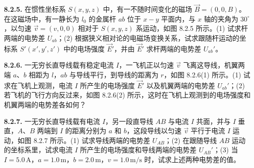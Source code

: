 \begin{center}
\end{center}

\vfill
\newpage

\textbf{8.2.5.} 在惯性坐标系 $S(x, y, z)$ 中，有一不随时间变化的磁场 $\vec{B} = (0, 0, B)$。在这磁场中，有一静长为 $l_0$ 的金属杆 $ab$ 位于 $x-y$ 平面内，与 $x$ 轴的夹角为 $30^\circ$，以匀速 $\vec{v} = (v, 0, 0)$ 相对于 $S(x, y, z)$ 系运动，如图 8.2.5 所示。(1) 试求杆两端的电势差 $U_{ab}$；(2) 根据狭义相对论的电磁场变换关系，试求跟随杆运动的坐标系 $S'(x', y', z')$ 中的电场强度 $\vec{E}'$，并由 $\vec{E}'$ 求杆两端的电势差 $U_{ab}'$。

\begin{center}
\end{center}

\vfill
\newpage

\textbf{8.2.6.} 一无穷长直导线载有稳定电流 $I$，一飞机正以匀速 $\vec{v}$ 飞离这导线，机翼两端 $a$、$b$ 相距为 $l$，$ab$ 与导线平行，到导线的距离为 $r$，如图 8.2.6(1) 所示。(1) 试求在飞机上观测，电流 $I$ 所产生的电场强度 $\vec{E}'$ 以及机翼两端的电势差 $U_{ab}'$；(2) 若飞机的飞行方向反过来，如图 8.2.6(2) 所示，这时在飞机上观测到的电场强度和机翼两端的电势差各如何？

\begin{center}
  \begin{minipage}[b]{0.47\linewidth}
    \centering
  \end{minipage}\hfill
  \begin{minipage}[b]{0.47\linewidth}
    \centering
  \end{minipage}
\end{center}

\vfill
\newpage

\textbf{8.2.7.} 一无穷长直导线载有电流 $I$，另一段直导线 $AB$ 与电流 $I$ 共面，并与 $I$ 垂直，$A$、$B$ 两端到 $I$ 的距离分别为 $a$ 和 $b$，这段导线以匀速 $\vec{v}$ 平行于电流 $I$ 运动，如图 8.2.7 所示。(1) 试求导线两端的电势差 $U_{AB}$；(2) 在跟随导线 $AB$ 运动的坐标系里，试求电流 $I$ 所产生的电场强度和导线两端的电势差 $U_{AB}'$；(3) 当 $I = 5.0\,\mathrm{A}$，$a = 1.0\,\mathrm{m}$，$b = 2.0\,\mathrm{m}$，$v = 1.0\,\mathrm{m/s}$ 时，试求上述两种电势差的值。

\begin{center}
\end{center}


